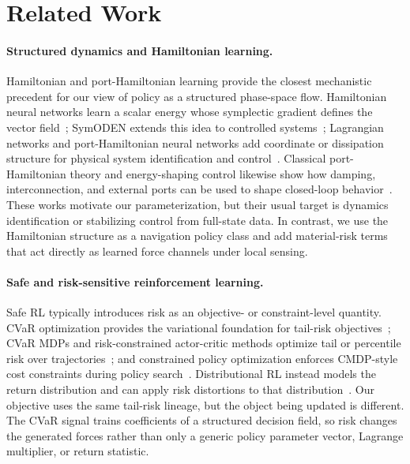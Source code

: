 \section{Related Work}
\label{sec:related}

\paragraph{Structured dynamics and Hamiltonian learning.}
Hamiltonian and port-Hamiltonian learning provide the closest mechanistic
precedent for our view of policy as a structured phase-space flow.
Hamiltonian neural networks learn a scalar energy whose symplectic
gradient defines the vector field~\citep{greydanus2019hamiltonian};
SymODEN extends this idea to controlled systems~\citep{zhong2020symplectic};
Lagrangian networks and port-Hamiltonian neural networks add coordinate
or dissipation structure for physical system identification and
control~\citep{cranmer2020lagrangian,desai2021porthamiltonian}.
Classical port-Hamiltonian theory and energy-shaping control likewise
show how damping, interconnection, and external ports can be used to
shape closed-loop behavior~\citep{vanderschaft2014port}.
These works motivate our parameterization, but their usual target is
dynamics identification or stabilizing control from full-state data.
In contrast, we use the Hamiltonian structure as a navigation policy
class and add material-risk terms that act directly as learned force
channels under local sensing.

\paragraph{Safe and risk-sensitive reinforcement learning.}
Safe RL typically introduces risk as an objective- or constraint-level
quantity. CVaR optimization provides the variational foundation for
tail-risk objectives~\citep{rockafellar2000optimization}; CVaR MDPs and
risk-constrained actor-critic methods optimize tail or percentile risk
over trajectories~\citep{chow2015risk,chow2017risk}; and constrained
policy optimization enforces CMDP-style cost constraints during policy
search~\citep{achiam2017constrained}. Distributional RL instead models
the return distribution and can apply risk distortions to that
distribution~\citep{bellemare2017distributional,dabney2018implicit}.
Our objective uses the same tail-risk lineage, but the object being
updated is different. The CVaR signal trains coefficients of a structured
decision field, so risk changes the generated forces rather than only a
generic policy parameter vector, Lagrange multiplier, or return statistic.

